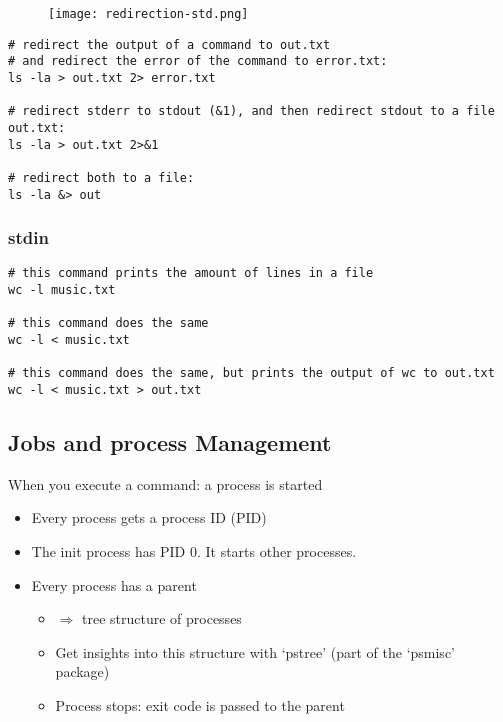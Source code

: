 \documentclass{article}
\begin{document}
\begin{figure}[H]
    \centering
    \texttt{[image: redirection-std.png]}
\end{figure}

\begin{verbatim}
# redirect the output of a command to out.txt 
# and redirect the error of the command to error.txt:
ls -la > out.txt 2> error.txt

# redirect stderr to stdout (&1), and then redirect stdout to a file out.txt:
ls -la > out.txt 2>&1

# redirect both to a file:
ls -la &> out
\end{verbatim}

\subsubsection{stdin}

\begin{verbatim}
# this command prints the amount of lines in a file
wc -l music.txt

# this command does the same
wc -l < music.txt

# this command does the same, but prints the output of wc to out.txt
wc -l < music.txt > out.txt
\end{verbatim}

\subsection{Jobs and process Management}

When you execute a command: a process is started

\begin{itemize}
    \item Every process gets a process ID (PID)
    \item The init process has PID 0. It starts other processes.
    \item Every process has a parent
    \begin{itemize}
        \item $\Rightarrow$ tree structure of processes
        \item Get insights into this structure with `pstree' (part of the `psmisc' package)
        \item Process stops: exit code is passed to the parent
    \end{itemize}
\end{itemize}
\end{document}
